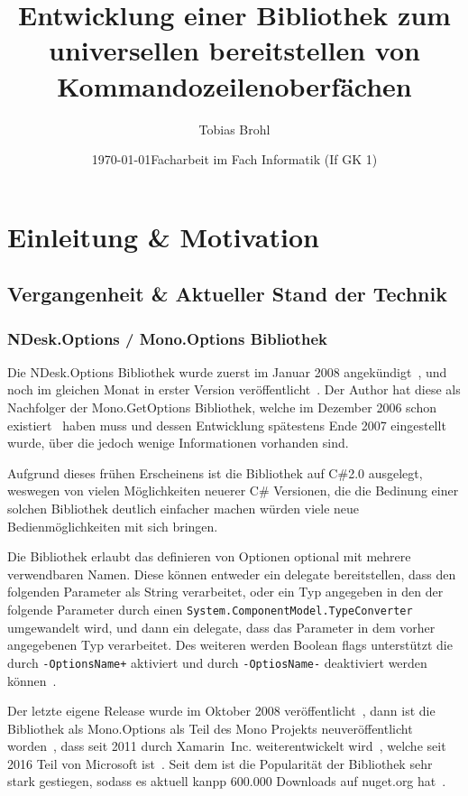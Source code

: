 \documentclass[a4paper,12pt,titlepage,ngerman,bibliography=totocnumbered]{article}
\title{Entwicklung einer Bibliothek zum universellen bereitstellen von Kommandozeilenoberfächen}
\author{Tobias Brohl}
\date{\today \linebreak \linebreak Facharbeit im Fach Informatik (If GK 1)}
\newcommand{\inlinecode}[1]{{\lstinline[]$#1$}}
\begin{document}
 \begin{sloppypar}
  \maketitle
  \setcounter{tocdepth}{5}
  \tableofcontents
  \pagebreak
  \section{Einleitung \& Motivation}\label{sec:Intro}
  \subsection{Vergangenheit \& Aktueller Stand der Technik}\label{subsec:CurrentState}
  \subsubsection{NDesk.Options / Mono.Options Bibliothek}
  Die NDesk.Options Bibliothek wurde zuerst im Januar 2008 angekündigt~\cite{NDeskAnnouncement}, 
  und noch im gleichen Monat in erster Version veröffentlicht~\cite{NDesk1stRelease}.
  Der Author hat diese als Nachfolger der Mono.GetOptions Bibliothek, 
  welche im Dezember 2006 schon existiert~\cite{MonoGetOptions3rdBlogPost} haben muss und dessen Entwicklung spätestens Ende 2007 eingestellt wurde, 
  über die jedoch wenige Informationen vorhanden sind.
  
  Aufgrund dieses frühen Erscheinens ist die Bibliothek auf C\#2.0 ausgelegt, weswegen von vielen Möglichkeiten neuerer C\# Versionen, 
  die die Bedinung einer solchen Bibliothek deutlich einfacher machen würden  viele neue Bedienmöglichkeiten mit sich bringen.
  
  Die Bibliothek erlaubt das definieren von Optionen optional mit mehrere verwendbaren Namen.
  Diese können entweder ein delegate bereitstellen, dass den folgenden Parameter als String verarbeitet, 
  oder ein Typ angegeben in den der folgende Parameter durch einen \inlinecode{System.ComponentModel.TypeConverter} umgewandelt wird,
  und dann ein delegate, dass das Parameter in dem vorher angegebenen Typ verarbeitet.
  Des weiteren werden Boolean flags unterstützt die durch \inlinecode{-OptionsName+} aktiviert 
  und durch \inlinecode{-OptiosName-} deaktiviert werden können~\cite{NDeskOptionSetDocumentation}.
  
  Der letzte eigene Release wurde im Oktober 2008 veröffentlicht~\cite{NDeskOptionsLastRelease},
  dann ist die Bibliothek als Mono.Options als Teil des Mono Projekts neuveröffentlicht worden~\cite{MonoOptions1stCommit}, 
  dass seit 2011 durch Xamarin~Inc. weiterentwickelt wird~\cite{MonoFutureInterview}, welche seit 2016 Teil von Microsoft ist~\cite{MicrosoftBlogAcquireXamarin}.
  Seit dem ist die Popularität der Bibliothek sehr stark gestiegen, sodass es aktuell kanpp 600.000 Downloads auf nuget.org hat~\cite{MonoOptionsNuget}.

\end{sloppypar}
\end{document}
